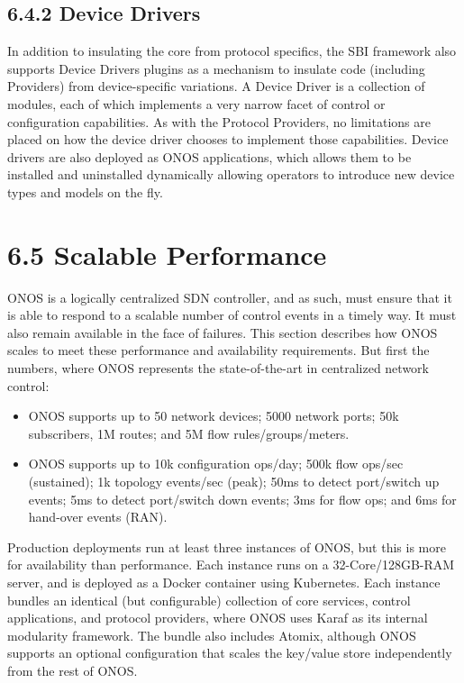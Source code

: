 \documentclass[letterpaper,11pt,english]{sphinxmanual}
\begin{document}
\subsection{6.4.2 Device Drivers}
\label{\detokenize{onos:device-drivers}}
In addition to insulating the core from protocol specifics, the SBI
framework also supports Device Drivers plugins as a mechanism to
insulate code (including Providers) from device-specific variations. A
Device Driver is a collection of modules, each of which implements a
very narrow facet of control or configuration capabilities. As with
the Protocol Providers, no limitations are placed on how the device
driver chooses to implement those capabilities. Device drivers are
also deployed as ONOS applications, which allows them to be installed
and uninstalled dynamically allowing operators to introduce new device
types and models on the fly.


\section{6.5 Scalable Performance}
\label{\detokenize{onos:scalable-performance}}
ONOS is a logically centralized SDN controller, and as such, must
ensure that it is able to respond to a scalable number of control
events in a timely way. It must also remain available in the face of
failures. This section describes how ONOS scales to meet these
performance and availability requirements. But first the numbers,
where ONOS represents the state-of-the-art in centralized network
control:
\begin{itemize}
\item {} 
 ONOS supports up to 50 network devices; 5000 network
ports; 50k subscribers, 1M routes; and 5M flow rules/groups/meters.

\item {} 
 ONOS supports up to 10k configuration ops/day; 500k
flow ops/sec (sustained); 1k topology events/sec (peak); 50ms to
detect port/switch up events; 5ms to detect port/switch down events;
3ms for flow ops; and 6ms for hand-over events (RAN).

\end{itemize}

Production deployments run at least three instances of ONOS, but this
is more for availability than performance. Each instance runs on a
32-Core/128GB-RAM server, and is deployed as a Docker container using
Kubernetes. Each instance bundles an identical (but configurable)
collection of core services, control applications, and protocol
providers, where ONOS uses Karaf as its internal modularity framework.
The bundle also includes Atomix, although ONOS supports an optional
configuration that scales the key/value store independently from the
rest of ONOS.
\end{document}
